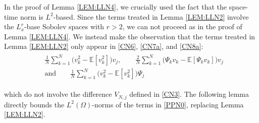 \documentclass[letterpaper, 11pt,  reqno]{amsart}
\newcommand{\1}{\hspace{0.5mm}\text{I}\hspace{0.2mm}}
\newcommand{\noi}{\noindent}
\newcommand{\E}{\mathbb{E}}
\renewcommand{\O}{\Omega}
\numberwithin{equation}{section}
\numberwithin{theorem}{section}
\begin{document}
In the proof of Lemma \ref{LEM:LLN4}, 
we crucially used the fact that the space-time norm
is $L^2$-based.
Since the terms treated in Lemma \ref{LEM:LLN2} 
involve the $L^r_x$-base Sobolev spaces with $r > 2$, 
we can not proceed as in the proof of 
Lemma \ref{LEM:LLN4}. 
We instead make the observation that 
the terms 
treated in Lemma \ref{LEM:LLN2} 
only appear in 
\eqref{CN6}, \eqref{CN7a}, 
and \eqref{CN8a}:
\begin{align}
\begin{split}
& \frac{1}{N} \sum_{k = 1}^N \Big( v_k^2 - \E [ v_k^2 ] \Big)  v_j, \qquad 
 \frac{2}{N} \sum_{k = 1}^N 
\Big( \Psi_k v_{k}
-  \E [ \Psi_k v_k ]\Big) v_j \\
& \text{and}\qquad 
 \frac{1}{N} \sum_{k = 1}^N 
\Big(v_{k}^2 
- \E [ v_k^2 ] \Big) \Psi_j 
\end{split}
\label{PPN0}
\end{align}


\noi
which do not involve 
the difference $V_{N, j}$ defined in \eqref{CN3}.
The following lemma
directly bounds
the $L^2(\O)$-norms
of the terms in \eqref{PPN0}, 
replacing Lemma \ref{LEM:LLN2}.
\end{document}
